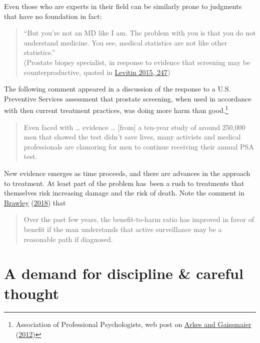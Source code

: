 \documentclass[
  10pt,
  b5paper]{book}
\begin{document}
Even those who are experts in their field can be similarly prone to judgments
that have no foundation in fact:

\begin{quote}
``But you're not an MD like I am. The problem with you is that you
do not understand medicine. You see, medical statistics are not
like other statistics.''\\
(Prostate biopsy specialist, in response to evidence that screening
may be counterproductive, quoted in \protect\hyperlink{ref-levitin_2015}{Levitin 2015, 247})
\end{quote}

The following comment appeared in a discussion of the response
to a U.S. Preventive Services assessment that prostate screening,
when used in accordance with then current treatment practices,
was doing more harm than good.\footnote{Association of Professional
  Psychologists, web post on \protect\hyperlink{ref-arkes2012psychological}{Arkes and Gaissmaier} (\protect\hyperlink{ref-arkes2012psychological}{2012})}

\begin{quote}
Even faced with \ldots{} evidence \ldots{} {[}from{]} a ten-year study of around 250,000 men that showed the test didn't save lives, many activists and medical professionals are clamoring for men to continue receiving their annual PSA test.
\end{quote}

New evidence emerges as time proceeds, and there are advances in the
approach to treatment. At least part of the problem has~been a rush
to treatments that themselves risk increasing damage and the risk of
death. Note the comment in \protect\hyperlink{ref-brawley2018prostate}{Brawley} (\protect\hyperlink{ref-brawley2018prostate}{2018}) that

\begin{quote}
Over the past few years, the benefit‐to‐harm ratio has
improved in favor of benefit if the man understands that
active surveillance may be a reasonable path if diagnosed.
\end{quote}

\hypertarget{a-demand-for-discipline-careful-thought}{%
\section{A demand for discipline \& careful thought}\label{a-demand-for-discipline-careful-thought}}
\end{document}
